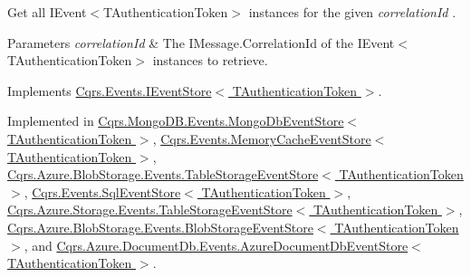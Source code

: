 Get all I\+Event$<$\+T\+Authentication\+Token$>$ instances for the given {\itshape correlation\+Id} . 


\begin{DoxyParams}{Parameters}
{\em correlation\+Id} & The I\+Message.\+Correlation\+Id of the I\+Event$<$\+T\+Authentication\+Token$>$ instances to retrieve.\\
\hline
\end{DoxyParams}


Implements \hyperlink{interfaceCqrs_1_1Events_1_1IEventStore_af398bb6768fa661ad97a9fa9ecfbd9fb_af398bb6768fa661ad97a9fa9ecfbd9fb}{Cqrs.\+Events.\+I\+Event\+Store$<$ T\+Authentication\+Token $>$}.



Implemented in \hyperlink{classCqrs_1_1MongoDB_1_1Events_1_1MongoDbEventStore_ac886ca0a57ad86cb99ef0a3767db9280_ac886ca0a57ad86cb99ef0a3767db9280}{Cqrs.\+Mongo\+D\+B.\+Events.\+Mongo\+Db\+Event\+Store$<$ T\+Authentication\+Token $>$}, \hyperlink{classCqrs_1_1Events_1_1MemoryCacheEventStore_a2a93a3f10423f608527fbc41a7ce8cef_a2a93a3f10423f608527fbc41a7ce8cef}{Cqrs.\+Events.\+Memory\+Cache\+Event\+Store$<$ T\+Authentication\+Token $>$}, \hyperlink{classCqrs_1_1Azure_1_1BlobStorage_1_1Events_1_1TableStorageEventStore_a9b952a9257dc6f458b98eba87684412e_a9b952a9257dc6f458b98eba87684412e}{Cqrs.\+Azure.\+Blob\+Storage.\+Events.\+Table\+Storage\+Event\+Store$<$ T\+Authentication\+Token $>$}, \hyperlink{classCqrs_1_1Events_1_1SqlEventStore_ac1fb2bdec07cbeec57fb3d985e7a8b31_ac1fb2bdec07cbeec57fb3d985e7a8b31}{Cqrs.\+Events.\+Sql\+Event\+Store$<$ T\+Authentication\+Token $>$}, \hyperlink{classCqrs_1_1Azure_1_1Storage_1_1Events_1_1TableStorageEventStore_a1b436bbb111b14b85ee6ba7f90fb1a35_a1b436bbb111b14b85ee6ba7f90fb1a35}{Cqrs.\+Azure.\+Storage.\+Events.\+Table\+Storage\+Event\+Store$<$ T\+Authentication\+Token $>$}, \hyperlink{classCqrs_1_1Azure_1_1BlobStorage_1_1Events_1_1BlobStorageEventStore_a660c786205693ee34a11e205c6d136ad_a660c786205693ee34a11e205c6d136ad}{Cqrs.\+Azure.\+Blob\+Storage.\+Events.\+Blob\+Storage\+Event\+Store$<$ T\+Authentication\+Token $>$}, and \hyperlink{classCqrs_1_1Azure_1_1DocumentDb_1_1Events_1_1AzureDocumentDbEventStore_ac59ce599b768ce047869b8ac135f4e22_ac59ce599b768ce047869b8ac135f4e22}{Cqrs.\+Azure.\+Document\+Db.\+Events.\+Azure\+Document\+Db\+Event\+Store$<$ T\+Authentication\+Token $>$}.

\mbox{\label{classCqrs_1_1Events_1_1EventStore_aa6ffed5d7dd365600669149da29f9e89_aa6ffed5d7dd365600669149da29f9e89}} 
